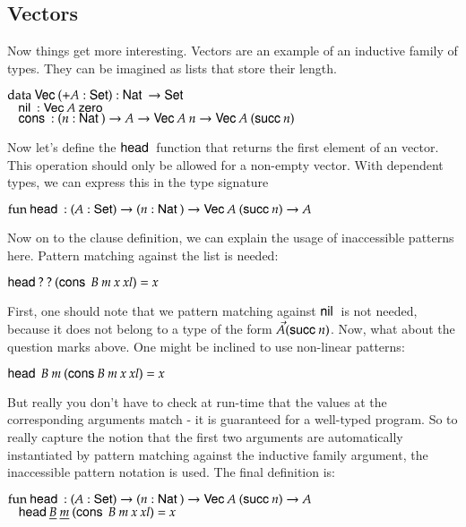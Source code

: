 \subsection{Vectors}
Now things get more interesting. Vectors are an example of an inductive family of types.
They can be imagined as lists that store their length.
\begin{bsp}
$\mathrm{data}\: \mathsf{Vec}\: ( + A : \mathsf{Set} ) : \mathsf{Nat}\: \rightarrow \mathsf{Set} $ \\
$\hspace*{3mm} \mathsf{nil}\: : \mathsf{Vec}\: A \: \mathsf{zero}\:  $\\
$ \hspace*{3mm} \mathsf{cons}\: : ( n : \mathsf{Nat}\: ) \rightarrow{ A \rightarrow\mathsf{Vec}\:A \: n \rightarrow\mathsf{Vec}\:A \: (\mathsf{succ}\:n)} $
\end{bsp}
Now let's define the $\mathsf{head}\:$ function that returns the first element of an vector. This operation should only be allowed for a non-empty vector.
With dependent types, we can express this in the type signature
\begin{bsp}
$ \mathrm{fun}\: \mathsf{head}\: : ( A : \mathsf{Set} ) \rightarrow ( n : \mathsf{Nat}\: ) \rightarrow \mathsf{Vec}\: A \: (\mathsf{succ}\: n) \rightarrow A $
\end{bsp}
Now on to the clause definition, we can explain the usage of inaccessible patterns here.
Pattern matching against the list is needed:
\begin{bsp}
$\mathsf{head}\: ? \: ? \: (\mathsf{cons}\: \: B \: m \: x \: xl) = x $
\end{bsp}
First, one should note that we pattern matching against $\mathsf{nil}\:$ is not needed, because it does not belong to
a type of the form $\Vec A (\mathsf{succ}\: n)$.
Now, what about the question marks above. 
One might be inclined to use non-linear patterns:
\begin{bsp}
$\mathsf{head}\: \: B \: m \: (\mathsf{cons}\:  B \: m \: x \: xl) = x $
\end{bsp}
But really you don't have to check at run-time that the values at the corresponding arguments match - it is guaranteed for a well-typed program.
So to really capture the notion that the first two arguments are automatically instantiated by pattern matching against the inductive family argument, the inaccessible pattern notation is used. The final definition is:
\begin{bsp}
$ \mathrm{fun}\: \mathsf{head}\: : ( A : \mathsf{Set} ) \rightarrow ( n : \mathsf{Nat}\: ) \rightarrow \mathsf{Vec}\: A \: (\mathsf{succ}\: n) \rightarrow A $\\
$ \hspace*{3mm} \mathsf{head}\: \underline{B} \: \underline{m} \: (\mathsf{cons}\: \: B \: m \: x \: xl) = x $
\end{bsp}
